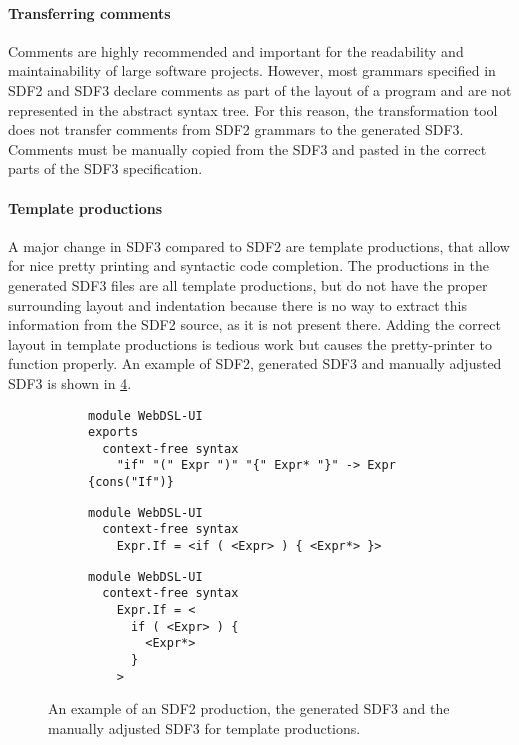       \paragraph{Transferring comments} Comments are highly recommended and important for the readability and maintainability of large software projects. However, most grammars specified in SDF2 and SDF3 declare comments as part of the layout of a program and are not represented in the abstract syntax tree. For this reason, the transformation tool does not transfer comments from SDF2 grammars to the generated SDF3. Comments must be manually copied from the SDF3 and pasted in the correct parts of the SDF3 specification.

      \paragraph{Template productions} A major change in SDF3 compared to SDF2 are template productions, that allow for nice pretty printing and syntactic code completion. The productions in the generated SDF3 files are all template productions, but do not have the proper surrounding layout and indentation because there is no way to extract this information from the SDF2 source, as it is not present there. Adding the correct layout in template productions is tedious work but causes the pretty-printer to function properly. An example of SDF2, generated SDF3 and manually adjusted SDF3 is shown in \cref{fig:sdf2-sdf3-template-production}.

      \begin{figure}
        \begin{subfigure}[b]{1\textwidth}
          \begin{verbatim}
module WebDSL-UI
exports
  context-free syntax
    "if" "(" Expr ")" "{" Expr* "}" -> Expr {cons("If")}
          \end{verbatim}
          \caption{\label{fig:sdf2-sdf3-template-production-sdf2}}
        \end{subfigure}
        \begin{subfigure}[b]{0.6\textwidth}
          \begin{verbatim}
module WebDSL-UI
  context-free syntax
    Expr.If = <if ( <Expr> ) { <Expr*> }>
          \end{verbatim}
          \caption{\label{fig:sdf2-sdf3-template-production-sdf3-gen}}
        \end{subfigure}
        \begin{subfigure}[b]{0.4\textwidth}
          \begin{verbatim}
module WebDSL-UI
  context-free syntax
    Expr.If = <
      if ( <Expr> ) {
        <Expr*> 
      }
    >
          \end{verbatim}
          \caption{\label{fig:sdf2-sdf3-template-production-sdf3-adjusted}}
        \end{subfigure}
        \caption{\label{fig:sdf2-sdf3-template-production}An example of an SDF2 production, the generated SDF3 and the manually adjusted SDF3 for template productions.}
      \end{figure}

